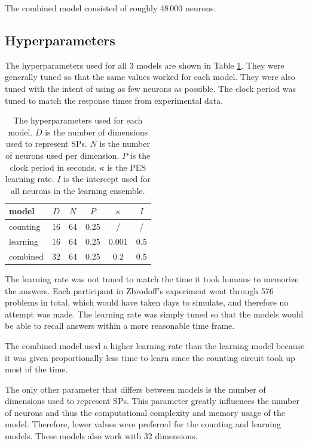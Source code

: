 \documentclass[10pt, a4paper, twocolumn]{article}
\begin{document}
The combined model consisted of roughly 48\,000 neurons.

\subsection{Hyperparameters}

The hyperparameters used for all 3 models are shown in Table \ref{table:hyperparameters}. They were generally tuned so that the same values worked for each model. They were also tuned with the intent of using as few neurons as possible. The clock period was tuned to match the response times from \cite{Zbrodoff1995} experimental data.

\begin{table}[h]
	\centering
	\begin{tabular}{lccccc}
		model    & $D$ & $N$ & $P$  & $\kappa$ & $I$ \\\hline
		counting & 16  & 64  & 0.25 & /        & /   \\
		learning & 16  & 64  & 0.25 & 0.001    & 0.5 \\
		combined & 32  & 64  & 0.25 & 0.2      & 0.5 \\
	\end{tabular}
	\caption{The hyperparameters used for each model. $D$ is the number of dimensions used to represent SPs. $N$ is the number of neurons used per dimension. $P$ is the clock period in seconds. $\kappa$ is the PES learning rate. $I$ is the intercept used for all neurons in the learning ensemble.}
	\label{table:hyperparameters}
\end{table}

The learning rate was not tuned to match the time it took humans to memorize the answers. Each participant in Zbrodoff's experiment went through 576 problems in total, which would have taken days to simulate, and therefore no attempt was made. The learning rate was simply tuned so that the models would be able to recall answers within a more reasonable time frame.

The combined model used a higher learning rate than the learning model because it was given proportionally less time to learn since the counting circuit took up most of the time.

The only other parameter that differs between models is the number of dimensions used to represent SPs. This parameter greatly influences the number of neurons and thus the computational complexity and memory usage of the model. Therefore, lower values were preferred for the counting and learning models. These models also work with 32 dimensions.
\end{document}
